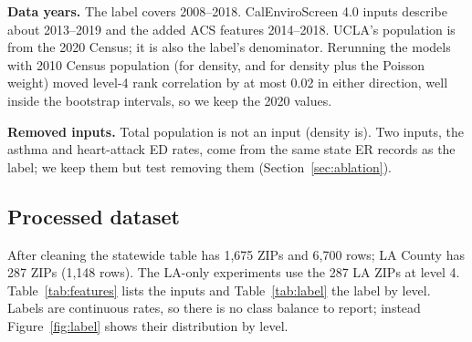 \documentclass[10pt]{article}
\begin{document}
\textbf{Data years.} The label covers 2008--2018. CalEnviroScreen 4.0 inputs describe about 2013--2019 and the added ACS features 2014--2018. UCLA's population is from the 2020 Census; it is also the label's denominator. Rerunning the models with 2010 Census population (for density, and for density plus the Poisson weight) moved level-4 rank correlation by at most 0.02 in either direction, well inside the bootstrap intervals, so we keep the 2020 values.

\textbf{Removed inputs.} Total population is not an input (density is). Two inputs, the asthma and heart-attack ED rates, come from the same state ER records as the label; we keep them but test removing them (Section~\ref{sec:ablation}).

\subsection{Processed dataset}
After cleaning the statewide table has 1,675 ZIPs and 6,700 rows; LA County has 287 ZIPs (1,148 rows). The LA-only experiments use the 287 LA ZIPs at level 4. Table~\ref{tab:features} lists the inputs and Table~\ref{tab:label} the label by level. Labels are continuous rates, so there is no class balance to report; instead Figure~\ref{fig:label} shows their distribution by level.
\end{document}
